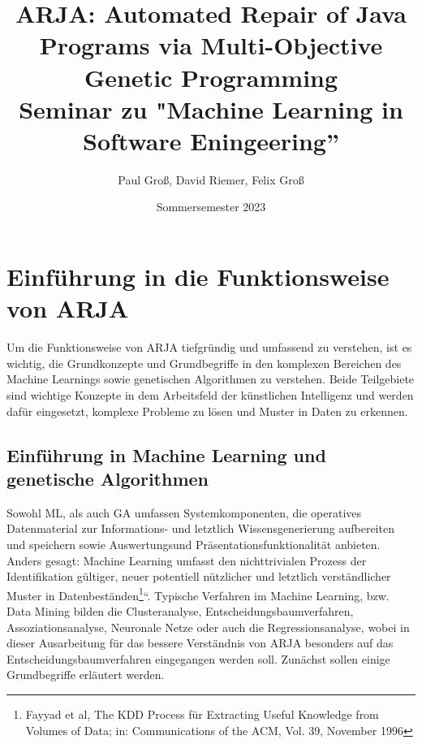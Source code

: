 \documentclass[11pt,a4paper]{article}
\title{ARJA: Automated Repair of Java Programs via
Multi-Objective Genetic Programming \\[0.5em] \large{Seminar zu "Machine Learning in Software Eningeering'' \\[0.5em]} }
\author{Paul Groß, David Riemer, Felix Groß}
\date{Sommersemester 2023}
\begin{document}
\maketitle

\section{Einführung in die Funktionsweise von ARJA}
Um die Funktionsweise von ARJA tiefgründig und umfassend zu verstehen, ist es wichtig, die Grundkonzepte und Grundbegriffe in den komplexen Bereichen des Machine Learnings sowie genetischen Algorithmen zu verstehen. Beide Teilgebiete sind wichtige Konzepte in dem Arbeitsfeld der künstlichen Intelligenz und werden dafür eingesetzt, komplexe Probleme zu lösen und Muster in Daten zu erkennen. 
\subsection{Einführung in Machine Learning und genetische Algorithmen}
Sowohl ML, als auch GA umfassen Systemkomponenten, die operatives Datenmaterial zur Informations- und letztlich Wissensgenerierung aufbereiten und speichern sowie Auswertungsund Präsentationsfunktionalität anbieten. Anders gesagt: Machine Learning umfasst den nichttrivialen Prozess der Identifikation gültiger, neuer potentiell nützlicher und letztlich verständlicher Muster in Datenbeständen\footnote{Fayyad et al, The KDD Process für Extracting Useful Knowledge from Volumes of Data; in: Communications of the ACM, Vol. 39, November 1996
}“. Typische Verfahren im Machine Learning, bzw. Data Mining bilden die Clusteranalyse, Entscheidungsbaumverfahren, Assoziationsanalyse, Neuronale Netze oder auch die Regressionsanalyse, wobei in dieser Ausarbeitung für das bessere Verständnis von ARJA besonders auf das Entscheidungsbaumverfahren eingegangen werden soll. Zunächst sollen einige Grundbegriffe erläutert werden. \\ 
\end{document}
